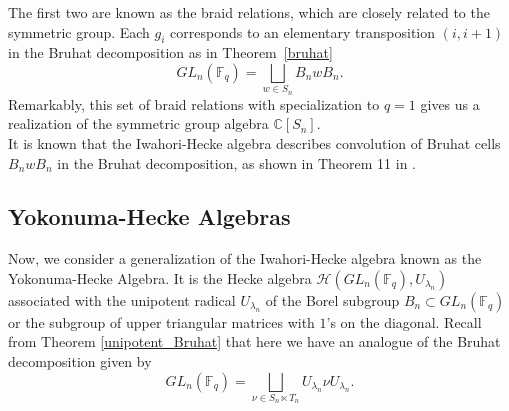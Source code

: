 \documentclass[12pt,reqno]{amsart}
\theoremstyle{definition}
\theoremstyle{remark}
\newcommand{\thmref}[1]{Theorem~\ref{#1}}
\numberwithin{equation}{section}
\newcommand{\CC}{\mathbb{C}}
\newcommand{\GL}[1]{GL_{#1}(\mathbb{F}_q)}
\begin{document}
The first two are known as the braid relations, which are closely related to the symmetric group. Each $g_i$ corresponds to an elementary transposition $(i,i+1)$ in the Bruhat decomposition as in \thmref{bruhat}
\begin{equation}\label{Bruhat_decomposition_B}
    \GL{n}=\bigsqcup_{w\in S_n} B_n w B_n.
\end{equation}
Remarkably, this set of braid relations with specialization to $q=1$ gives us a realization of the symmetric group algebra $\CC[S_n]$.\\

It is known that the Iwahori-Hecke algebra describes convolution of Bruhat cells $B_n w B_n$ in the Bruhat decomposition, as shown in Theorem 11 in \cite{DB}. %

\subsection{Yokonuma-Hecke Algebras}

Now, we consider a generalization of the Iwahori-Hecke algebra known as the Yokonuma-Hecke Algebra. It is the Hecke algebra $\mathcal{H}(\GL{n},U_{\lambda_n})$ associated with the unipotent radical $U_{\lambda_n}$ of the Borel subgroup $B_n\subset \GL{n}$ or the subgroup of upper triangular matrices with $1$'s on the diagonal. Recall from Theorem \ref{unipotent_Bruhat} that here we have an analogue of the Bruhat decomposition given by
\begin{equation}\label{Bruhat_decomposition_U}
    \GL{n}=\bigsqcup_{\nu\in S_n \ltimes T_n} U_{\lambda_n} \nu U_{\lambda_n}.    
\end{equation}



\end{document}
